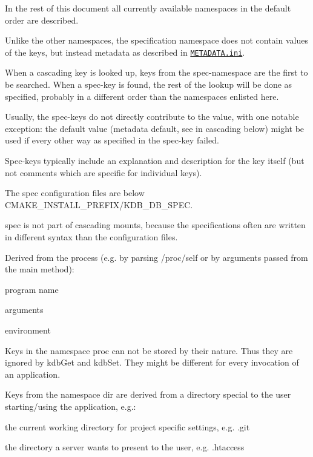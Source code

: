 In the rest of this document all currently available namespaces in the default order are described.

Unlike the other namespaces, the specification namespace does not contain values of the keys, but instead metadata as described in \href{/home/mpranj/workspace/libelektra/doc/METADATA.ini}{\texttt{ {\ttfamily M\+E\+T\+A\+D\+A\+T\+A.\+ini}}}.

When a cascading key is looked up, keys from the spec-\/namespace are the first to be searched. When a spec-\/key is found, the rest of the lookup will be done as specified, probably in a different order than the namespaces enlisted here.

Usually, the spec-\/keys do not directly contribute to the value, with one notable exception\+: the default value (metadata {\ttfamily default}, see in cascading below) might be used if every other way as specified in the spec-\/key failed.

Spec-\/keys typically include an explanation and description for the key itself (but not comments which are specific for individual keys).

The spec configuration files are below {\ttfamily C\+M\+A\+K\+E\+\_\+\+I\+N\+S\+T\+A\+L\+L\+\_\+\+P\+R\+E\+F\+I\+X/\+K\+D\+B\+\_\+\+D\+B\+\_\+\+S\+P\+EC}.

spec is not part of cascading mounts, because the specifications often are written in different syntax than the configuration files.

Derived from the process (e.\+g. by parsing {\ttfamily /proc/self} or by arguments passed from the main method)\+:


\begin{DoxyItemize}
\item program name
\item arguments
\item environment
\end{DoxyItemize}

Keys in the namespace proc can not be stored by their nature. Thus they are ignored by {\ttfamily kdb\+Get} and {\ttfamily kdb\+Set}. They might be different for every invocation of an application.

Keys from the namespace {\ttfamily dir} are derived from a directory special to the user starting/using the application, e.\+g.\+:


\begin{DoxyItemize}
\item the current working directory for project specific settings, e.\+g. {\ttfamily .git}
\item the directory a server wants to present to the user, e.\+g. {\ttfamily .htaccess}
\end{DoxyItemize}

